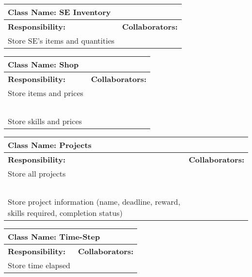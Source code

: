 \documentclass[]{article}
\begin{document}
\begin{table}[H]
    \centering
    \begin{tabular}{|p{5cm}|p{5cm}|}
        \hline
        \multicolumn{2}{|l|}{\textbf{Class Name:} SE Inventory}\\
        \hline
        \textbf{Responsibility:} & \textbf{Collaborators:}\\
        \hline
        Store SE’s items and quantities & ~\\
        \hline
    \end{tabular}
\end{table}

\begin{table}[H]
    \centering
    \begin{tabular}{|p{5cm}|p{5cm}|}
        \hline
        \multicolumn{2}{|l|}{\textbf{Class Name:} Shop}\\
        \hline
        \textbf{Responsibility:} & \textbf{Collaborators:}\\
        \hline
        Store items and prices & ~\\
        ~ & ~\\
        Store skills and prices & ~\\
        \hline
    \end{tabular}
\end{table}

\begin{table}[H]
    \centering
    \begin{tabular}{|p{5cm}|p{5cm}|}
        \hline
        \multicolumn{2}{|l|}{\textbf{Class Name:} Projects}\\
        \hline
        \textbf{Responsibility:} & \textbf{Collaborators:}\\
        \hline
        Store all projects & ~\\
        ~ & ~\\
        Store project information (name, deadline, reward, skills required, completion status) & ~\\
        \hline
    \end{tabular}
\end{table}

\begin{table}[H]
    \centering
    \begin{tabular}{|p{5cm}|p{5cm}|}
        \hline
        \multicolumn{2}{|l|}{\textbf{Class Name:} Time-Step}\\
        \hline
        \textbf{Responsibility:} & \textbf{Collaborators:}\\
        \hline
        Store time elapsed & ~\\
        \hline
    \end{tabular}
\end{table}
\end{document}
